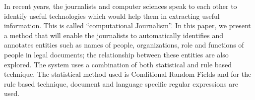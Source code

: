 In recent years, the journalists and computer sciences speak to each other to identify useful technologies which would help them in extracting useful information. This is called ``computational Journalism''. In this paper, we present a method that will enable the journalists to  automatically identifies and annotates entities such as names of people, organizations, role and functions of people in legal documents; the relationship between these entities are also explored. The system uses a combination of both statistical and rule based technique. The statistical method used is Conditional Random Fields and for the rule based technique, document and language specific regular expressions are used.
